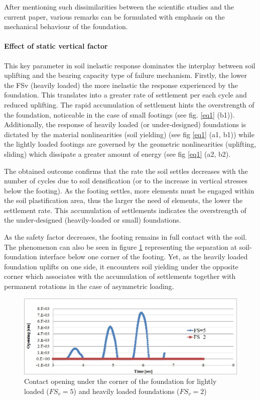 After mentioning such dissimilarities between the scientific studies and the current paper, various remarks can be formulated with emphasis on the mechanical behaviour of the foundation. 

\paragraph{Effect of static vertical factor} 
This key parameter in soil inelastic response dominates the interplay between soil uplifting and the bearing capacity type of failure mechanism. Firstly, the lower the FSv (heavily loaded) the more inelastic the response experienced by the foundation. This translates into a greater rate of settlement per each cycle and reduced uplifting. The rapid accumulation of settlement hints the overstrength of the foundation, noticeable in the case of small footings (see fig. \ref{eq1} (b1)). Additionally, the response of heavily loaded (or under-designed) foundations is dictated by the material nonlinearities (soil yielding) (see fig \ref{eq1} (a1, b1)) while the lightly loaded footings are governed by the geometric nonlinearities (uplifting, sliding) which dissipate a greater amount of energy (see fig \ref{eq1} (a2, b2).
 
 The obtained outcome confirms that the rate the soil settles decreases with the number of cycles due to soil densification (or to the increase in vertical stresses below the footing). As the footing settles, more elements must be engaged within the soil plastification area, thus the larger the need of elements, the lower the settlement rate. This accumulation of settlements indicates the overstrength of the under-designed (heavily-loaded or small) foundations.
 
 As the safety factor decreases, the footing remains in full contact with the soil. The phenomenon can also be seen in figure \ref{opening} representing the separation at soil-foundation interface below one corner of the footing. Yet, as the heavily loaded foundation uplifts on one side, it encounters soil yielding under the opposite corner which associates with the accumulation of settlements together with permanent rotations in the case of asymmetric loading. 
 
 	\begin{figure}[!h]
 		\centering
 		\includegraphics[width=0.8 \linewidth]{"opening"}
 		\caption{Contact opening under the corner of the foundation for lightly loaded ($FS_v=5$) and heavily loaded foundations ($FS_v=2$)}
 		\label{opening}
 	\end{figure}
 	
